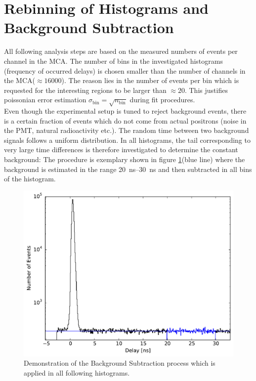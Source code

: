 \documentclass[
	paper=A4,
	parskip=full,
	chapterprefix=true,
	11pt,
	headings=normal,
	bibliography=totoc,
	listof=totoc,
	titlepage=on,
]{scrreprt}
\begin{document}
\section{Rebinning of Histograms and Background Subtraction}
All following analysis steps are based on the measured numbers of events per channel in the MCA. The number of bins in the investigated histograms (frequency of occurred delays) is chosen smaller than the number of channels in the MCA($\approx 16000$). The reason lies in the number of events per bin which is requested for the interesting regions to be larger than $\approx 20$. This justifies poissonian error estimation $\sigma_\textrm{bin}=\sqrt{n_\textrm{bin}}$ during fit procedures. \\

Even though the experimental setup is tuned to reject background events, there is a certain fraction of events which do not come from actual positrons (noise in the PMT, natural radioactivity etc.). The random time between two background signals follows a uniform distribution. In all histograms, the tail corresponding to very large time differences is therefore investigated to determine the constant background: The procedure is exemplary shown in figure \ref{fig:resolution_background}(blue line) where the background is estimated in the range \SIrange{20}{30}{\nano\second} and then subtracted in all bins of the histogram. 

\begin{figure}
	\centering
	\includegraphics{resolution_background}
	\caption{Demonstration of the Background Subtraction process which is applied in all following histograms.}
	\label{fig:resolution_background}
\end{figure}
\end{document}
